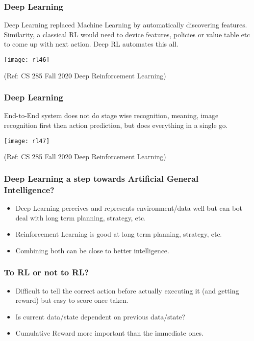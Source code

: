 \begin{frame}[fragile]\frametitle{Deep Learning}

Deep Learning replaced Machine Learning by automatically discovering features. Similarity, a classical RL would need to device features, policies or value table etc to come up with next action. Deep RL automates this all.

\begin{center}
\texttt{[image: rl46]}
\end{center}


{\tiny (Ref: CS 285 Fall 2020 Deep Reinforcement Learning)}

\end{frame}


\begin{frame}[fragile]\frametitle{Deep Learning}

End-to-End system does not do stage wise recognition, meaning, image recognition first then action prediction, but does everything in a single go.

\begin{center}
\texttt{[image: rl47]}
\end{center}


{\tiny (Ref: CS 285 Fall 2020 Deep Reinforcement Learning)}

\end{frame}

\begin{frame}[fragile]\frametitle{Deep Learning a step towards Artificial General Intelligence?}

\begin{itemize}
\item Deep Learning perceives and represents environment/data well but can bot deal with long term planning, strategy, etc.
\item Reinforcement Learning is good at long term planning, strategy, etc.
\item Combining both can be close to better intelligence. 
\end{itemize}

\end{frame}

\begin{frame}[fragile]\frametitle{To RL or not to RL?}

\begin{itemize}
\item Difficult to tell the correct action before actually executing it (and getting reward) but easy to score once taken.
\item Is current data/state dependent on previous data/state?
\item Cumulative Reward more important than the immediate ones.
\end{itemize}
\end{frame}

